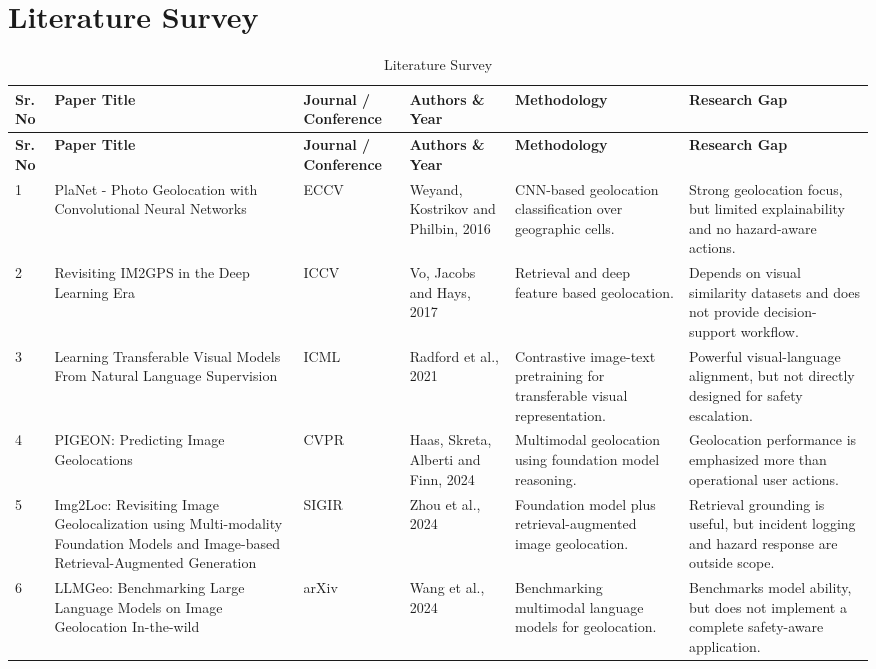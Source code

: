 \section{Literature Survey}
\begingroup
\fontsize{10}{12}\selectfont
\renewcommand{\arraystretch}{1.18}
\setlength{\tabcolsep}{3pt}
\begin{longtable}{|p{}|p{}|p{}|p{}|p{}|p{}|}
\caption{Literature Survey}
\label{tab:litsurvey}\\
\hline
\textbf{Sr. No} & \textbf{Paper Title} & \textbf{Journal / Conference} & \textbf{Authors \& Year} & \textbf{Methodology} & \textbf{Research Gap} \\
\hline
\endfirsthead
\hline
\textbf{Sr. No} & \textbf{Paper Title} & \textbf{Journal / Conference} & \textbf{Authors \& Year} & \textbf{Methodology} & \textbf{Research Gap} \\
\hline
\endhead
1 & PlaNet - Photo Geolocation with Convolutional Neural Networks & ECCV & Weyand, Kostrikov and Philbin, 2016 & CNN-based geolocation classification over geographic cells. & Strong geolocation focus, but limited explainability and no hazard-aware actions. \\
\hline
2 & Revisiting IM2GPS in the Deep Learning Era & ICCV & Vo, Jacobs and Hays, 2017 & Retrieval and deep feature based geolocation. & Depends on visual similarity datasets and does not provide decision-support workflow. \\
\hline
3 & Learning Transferable Visual Models From Natural Language Supervision & ICML & Radford et al., 2021 & Contrastive image-text pretraining for transferable visual representation. & Powerful visual-language alignment, but not directly designed for safety escalation. \\
\hline
4 & PIGEON: Predicting Image Geolocations & CVPR & Haas, Skreta, Alberti and Finn, 2024 & Multimodal geolocation using foundation model reasoning. & Geolocation performance is emphasized more than operational user actions. \\
\hline
5 & Img2Loc: Revisiting Image Geolocalization using Multi-modality Foundation Models and Image-based Retrieval-Augmented Generation & SIGIR & Zhou et al., 2024 & Foundation model plus retrieval-augmented image geolocation. & Retrieval grounding is useful, but incident logging and hazard response are outside scope. \\
\hline
6 & LLMGeo: Benchmarking Large Language Models on Image Geolocation In-the-wild & arXiv & Wang et al., 2024 & Benchmarking multimodal language models for geolocation. & Benchmarks model ability, but does not implement a complete safety-aware application. \\

\end{longtable}
